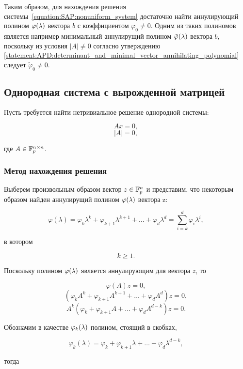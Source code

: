 Таким образом, для нахождения решения системы~\eqref{equation:SAP:nonuniform_system} достаточно найти аннулирующий полином
$\varphi (\lambda)$ вектора $b$ с коэффициентом $\varphi_0 \neq 0$. Одним из таких полиномов является например минимальный аннулирущий
полином $\tilde \varphi (\lambda)$ вектора $b$, поскольку из условия $\left | A \right | \neq 0$ согласно утверждению
\ref{statement:APD:determinant_and_minimal_vector_annihilating_polynomial} следует $\tilde \varphi_0 \neq 0$.

\subsection{Однородная система с вырожденной матрицей}\label{subsection:SAP:uniform}

Пусть требуется найти нетривиальное решение однородной системы:

	\begin{equation}\label{equation:SAP:uniform_system}
		A x = 0,
	\end{equation}
	$$ \left | A \right | = 0, $$

где $A \in \mathbb{F}^{n \times n}_p$.

\subsubsection{Метод нахождения решения}

Выберем произвольным образом вектор $z \in \mathbb{F}^{n}_p$ и представим, что некоторым образом найден аннулирущий полином
$\varphi (\lambda)$ вектора z:

	$$ \varphi(\lambda) =
		\varphi_k \lambda^k + \varphi_{k+1} \lambda^{k+1} + \ldots + \varphi_d \lambda^d = \sum_{i=k}^d \varphi_i\lambda^i, $$

в котором

	$$ k \ge 1. $$

Поскольку полином $\varphi (\lambda)$ является аннулирующим для вектора $z$, то

	$$ \varphi(A) z = 0, $$
	$$ \left ( \varphi_k A^k + \varphi_{k+1} A^{k+1} + \ldots + \varphi_d A^d \right ) z = 0, $$
	$$ A^k \left ( \varphi_k + \varphi_{k+1} A + \ldots + \varphi_d A^{d-k} \right ) z = 0. $$

Обозначим в качестве $\varphi_k (\lambda)$ полином, стоящий в скобках,

	$$ \varphi_k(\lambda) = \varphi_k + \varphi_{k+1} \lambda + \ldots + \varphi_d \lambda^{d-k}, $$

тогда

